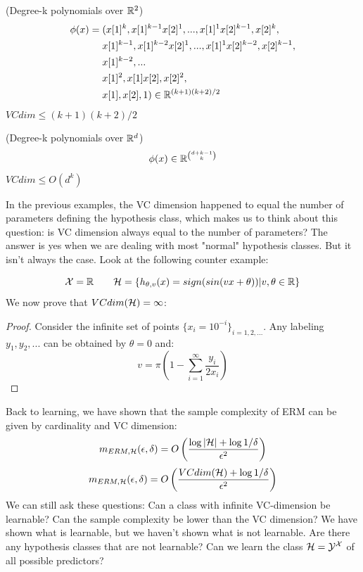 \documentclass{article}
\begin{document}
\begin{example}(Degree-k polynomials over $\mathbb{R}^2$)
	\begin{displaymath}
	\begin{aligned}
  		\phi(x)={} & (x[1]^k, x[1]^{k-1}x[2]^1, ..., x[1]^1x[2]^{k-1}, x[2]^k, \\
  		& x[1]^{k-1}, x[1]^{k-2}x[2]^1, ..., x[1]^1x[2]^{k-2}, x[2]^{k-1}, \\
  		& x[1]^{k-2},... \\
  		& x[1]^{2}, x[1]x[2], x[2]^{2}, \\
  		& x[1], x[2], 1) \in \mathbb{R}^{(k+1)(k+2)/2}
  	\end{aligned}
	\end{displaymath}
	$VCdim\leq (k+1)(k+2)/2$
\end{example}
\begin{example}(Degree-k polynomials over $\mathbb{R}^d$)
	\begin{displaymath}
		\phi(x) \in \mathbb{R}^{\binom {d+k-1} k}
	\end{displaymath}
	$VCdim\leq O(d^k)$
\end{example}
In the previous examples, the VC dimension happened to equal the number of parameters defining the hypothesis class, which makes us to think about this question: is VC dimension always equal to the number of parameters? The answer is yes when we are dealing with most "normal" hypothesis classes. But it isn't always the case. Look at the following counter example:
\begin{example}
	\begin{displaymath}
		\mathcal{X} = \mathbb{R} \qquad \mathcal{H}=\{h_{\theta,v}(x)=sign(sin(vx+\theta))|v,\theta\in \mathbb{R}\}
	\end{displaymath}
	We now prove that $VCdim(\mathcal{H})=\infty$:
	\begin{proof}
		Consider the infinite set of points $\{x_i=10^{-i}\}_{i=1,2,...}$. Any labeling $y_1,y_2,...$ can be obtained by $\theta=0$ and:
		\begin{displaymath}
  			v=\pi\left(1-\sum^\infty_{i=1}\frac{y_i}{2x_i}\right)
		\end{displaymath}
	\end{proof}
\end{example}
Back to learning, we have shown that the sample complexity of ERM can be given by cardinality and VC dimension:
\begin{displaymath}
  m_{ERM,\mathcal{H}}(\epsilon, \delta)=O\left(\frac{\log{|\mathcal{H}|}+\log{1/\delta}}{\epsilon^2}\right)
\end{displaymath}
\begin{displaymath}
  m_{ERM,\mathcal{H}}(\epsilon, \delta)=O\left(\frac{VCdim(\mathcal{H})+\log{1/\delta}}{\epsilon^2}\right)
\end{displaymath}
We can still ask these questions: Can a class with infinite VC-dimension be learnable? Can the sample complexity be lower than the VC dimension? We have shown what is learnable, but we haven't shown what is not learnable. Are there any hypothesis classes that are not learnable? Can we learn the class $\mathcal{H}=\mathcal{Y}^{\mathcal{X}}$ of all possible predictors?
\end{document}
